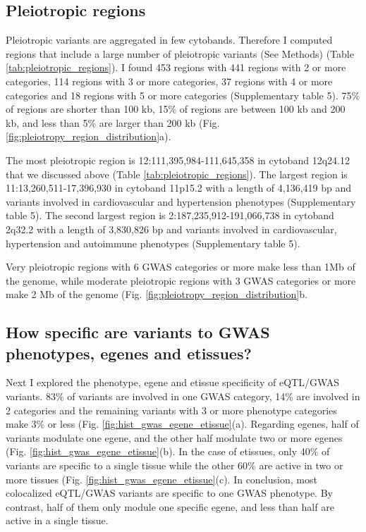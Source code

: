 \subsection*{Pleiotropic regions}

Pleiotropic variants are aggregated in few cytobands.
%
Therefore I computed regions that include a large number of pleiotropic variants (See Methods) (Table \ref{tab:pleiotropic_regions}).
%
I found 453 regions with 441 regions with 2 or more categories, 114 regions with 3 or more categories, 37 regions with 4 or more categories and 18 regions with 5 or more categories (Supplementary table 5).
%
75\% of regions are shorter than 100 kb, 15\% of regions are between 100 kb and 200 kb, and less than 5\% are larger than 200 kb (Fig. \ref{fig:pleiotropy_region_distribution}a).

The most pleiotropic region is 12:111,395,984-111,645,358 in cytoband 12q24.12 that we discussed above (Table \ref{tab:pleiotropic_regions}).
%
The largest region is 11:13,260,511-17,396,930 in cytoband 11p15.2 with a length of 4,136,419 bp and variants involved in cardiovascular and hypertension phenotypes (Supplementary table 5).
%
The second largest region is 2:187,235,912-191,066,738 in cytoband 2q32.2 with a length of 3,830,826 bp and variants involved in cardiovascular, hypertension and autoimmune phenotypes  (Supplementary table 5).

Very pleiotropic regions with 6 GWAS categories or more make less than 1Mb of the genome, while moderate pleiotropic regions with 3 GWAS categories or more make 2 Mb of the genome (Fig. \ref{fig:pleiotropy_region_distribution}b.

\subsection*{How specific are variants to GWAS phenotypes, egenes and etissues?}

Next I explored the phenotype, egene and etissue specificity of eQTL/GWAS variants.
%
83\% of variants are involved in one GWAS category, 14\% are involved in 2 categories and the remaining variants with 3 or more phenotype categories make 3\% or less (Fig. \ref{fig:hist_gwas_egene_etissue}(a).
%
Regarding egenes, half of variants modulate one egene, and the other half modulate two or more egenes (Fig. \ref{fig:hist_gwas_egene_etissue}(b).
%
In the case of etissues, only 40\% of variants are specific to a single tissue while the other 60\% are active in two or more tissues (Fig. \ref{fig:hist_gwas_egene_etissue}(c).
%
In conclusion, most colocalized eQTL/GWAS variants are specific to one GWAS phenotype. By contrast, half of them only module one specific egene, and less than half are active in a single tissue.

